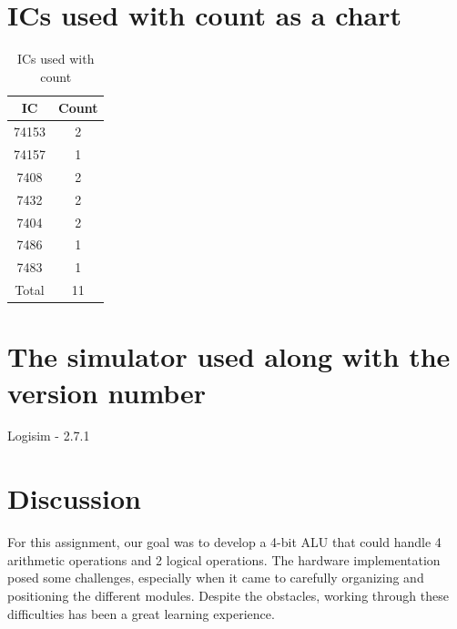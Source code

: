 \documentclass[11pt]{article}
\begin{document}
\section{ICs used with count as a chart}
\begin{table}[ht]
    \centering
    \begin{tabular}{|c|c|}
        \hline
        IC & Count \\
        \hline
        74153 & 2 \\
        \hline
        74157 & 1 \\
        \hline
        7408 & 2 \\
        \hline
        7432 & 2 \\
        \hline
        7404 & 2 \\
        \hline
        7486 & 1 \\
        \hline
        7483 & 1 \\
        \hline
        Total & 11 \\
        \hline
    \end{tabular}
    \caption{ICs used with count}
\end{table}

\section{The simulator used along with the version number}
Logisim - 2.7.1

\pagebreak 

\section{Discussion}

For this assignment, our goal was to develop a 4-bit ALU that could handle 4 arithmetic operations and 2 logical operations. The hardware implementation posed some challenges, especially when it came to carefully organizing and positioning the different modules. Despite the obstacles, working through these difficulties has been a great learning experience.
\end{document}
